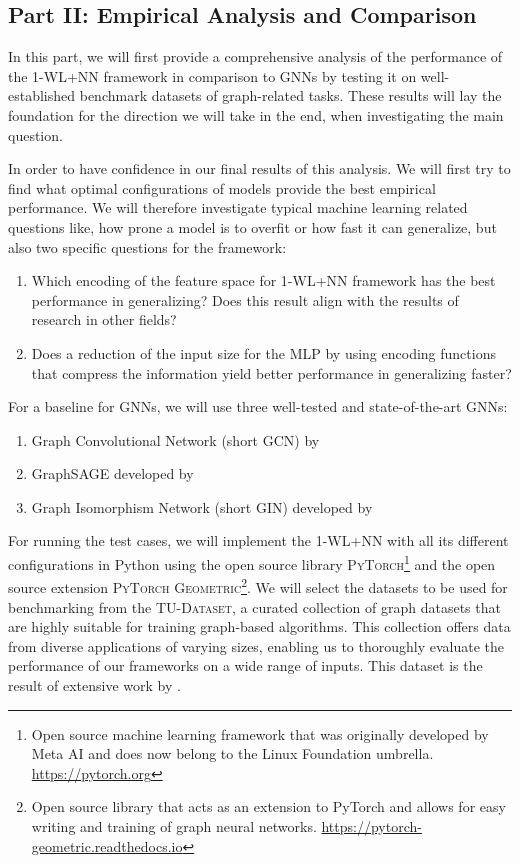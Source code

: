 \documentclass[11pt, dvipsnames, DIV=12]{scrreprt}
\theoremstyle{definition}
\newcommand{\wlnn}{\text{1-WL+NN }}
\begin{document}
\subsection{Part II: Empirical Analysis and Comparison}
In this part, we will first provide a comprehensive analysis of the performance of the 1-WL+NN framework in comparison to GNNs by testing it on well-established benchmark datasets of graph-related tasks. These results will lay the foundation for the direction we will take in the end, when investigating the main question.

In order to have confidence in our final results of this analysis. We will first try to find what optimal configurations of \wlnn models provide the best empirical performance. We will therefore investigate typical machine learning related questions like, how prone a model is to overfit or how fast it can generalize, but also two specific questions for the framework:
\begin{enumerate}[label=Q\arabic*)]
    \item Which encoding of the feature space for 1-WL+NN framework has the best performance in generalizing? Does this result align with the results of research in other fields?
    \item Does a reduction of the input size for the MLP by using encoding functions that compress the information yield better performance in generalizing faster?
\end{enumerate}
For a baseline for GNNs, we will use three well-tested and state-of-the-art GNNs:
\begin{enumerate}
    \item Graph Convolutional Network (short GCN) by \cite{Kip+2017}
    \item GraphSAGE developed by \cite{Ham+2017}
    \item Graph Isomorphism Network (short GIN) developed by \cite{Xu2018}
\end{enumerate}

For running the test cases, we will implement the 1-WL+NN with all its different configurations in Python using the open source library \textsc{PyTorch}\footnote{Open source machine learning framework that was originally developed by Meta AI and does now belong to the Linux Foundation umbrella. \href{https://pytorch.org}{https://pytorch.org}} and the open source extension \textsc{PyTorch Geometric}\footnote{Open source library that acts as an extension to PyTorch and allows for easy writing and training of graph neural networks. \href{https://pytorch-geometric.readthedocs.io/en/latest}{https://pytorch-geometric.readthedocs.io}}.
We will select the datasets to be used for benchmarking from the \textsc{TU-Dataset}, a curated collection of graph datasets that are highly suitable for training graph-based algorithms. This collection offers data from diverse applications of varying sizes, enabling us to thoroughly evaluate the performance of our frameworks on a wide range of inputs. This dataset is the result of extensive work by \cite{Mor+2020}.
\end{document}
